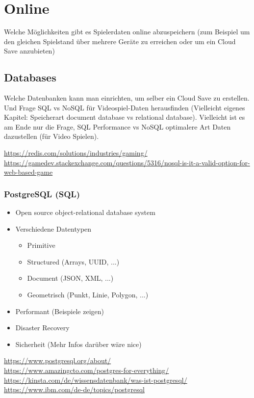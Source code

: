 \chapter{Online}\label{ch:online}
Welche Möglichkeiten gibt es Spielerdaten online abzuspeichern (zum Beispiel um den gleichen Spielstand über mehrere Geräte zu erreichen oder um ein Cloud Save anzubieten)

\section{Databases}
Welche Datenbanken kann man einrichten, um selber ein Cloud Save zu erstellen. Und Frage SQL vs NoSQL für Videospiel-Daten herausfinden (Vielleicht eigenes Kapitel: Speicherart document database vs relational database). Vielleicht ist es am Ende nur die Frage, SQL Performance vs NoSQL optimalere Art Daten dazustellen (für Video Spielen).

\url{https://redis.com/solutions/industries/gaming/}\\
\url{https://gamedev.stackexchange.com/questions/5316/nosql-is-it-a-valid-option-for-web-based-game}

\subsection{PostgreSQL (SQL)}
\begin{itemize}
    \item Open source object-relational database system
    \item Verschiedene Datentypen
    \begin{itemize}
        \item Primitive
        \item Structured (Arrays, UUID, ...)
        \item Document (JSON, XML, ...)
        \item Geometrisch (Punkt, Linie, Polygon, ...)
    \end{itemize}
    \item Performant (Beispiele zeigen)
    \item Disaster Recovery
    \item Sicherheit (Mehr Infos darüber wäre nice)
\end{itemize}

\url{https://www.postgresql.org/about/}\\
\url{https://www.amazingcto.com/postgres-for-everything/}\\
\url{https://kinsta.com/de/wissensdatenbank/was-ist-postgresql/}\\
\url{https://www.ibm.com/de-de/topics/postgresql}

